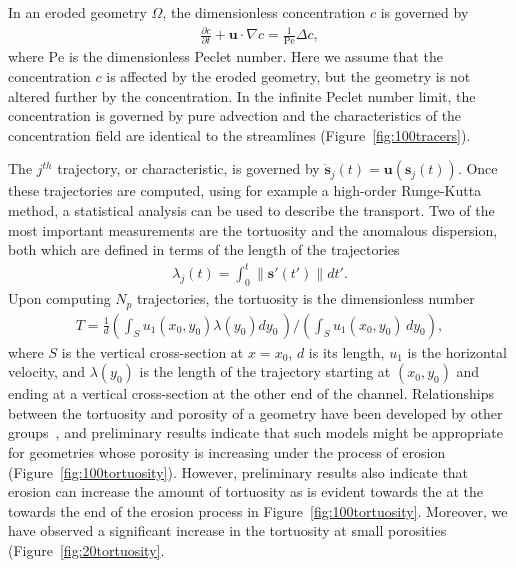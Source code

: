 \documentclass[11pt]{article}
\newcommand{\pd}[2]{ \frac{ \partial #1}{ \partial #2 } }
\newcommand{\bvec}[1]{{\mathbf{#1}}}
\newcommand{\Pe}{\mathrm{Pe}}
\newcommand{\uu}{\bvec{u}}
\renewcommand{\ss}{{\mathbf{s}}}
\begin{document}
In an eroded geometry $\Omega$, the dimensionless
concentration $c$ is governed by
\begin{align}
  \pd{c}{t} + \uu \cdot \nabla c = \frac{1}{\Pe} \Delta c, 
  \label{eqn:advectionDiffusion}
\end{align}
where $\Pe$ is the dimensionless Peclet number. Here we assume that the
concentration $c$ is affected by the eroded geometry, but the geometry
is not altered further by the concentration. In the infinite Peclet
number limit, the concentration is governed by pure advection and the
characteristics of the concentration field are identical to the
streamlines (Figure~\ref{fig:100tracers}).

The $j^{th}$ trajectory, or characteristic, is governed by $\dot{\ss}_j(t) = \uu(\ss_j(t))$. Once these trajectories are computed, using for example a high-order Runge-Kutta method, a statistical analysis can be used to describe the transport. Two of the most important measurements are the tortuosity and the anomalous dispersion, both which are defined in terms of the length of the trajectories \begin{align}
  \lambda_j(t) = \int_{0}^{t} \|\ss'(t')\| dt'.
\end{align}
Upon computing $N_p$ trajectories, the tortuosity is the dimensionless number
\begin{align}
  T = \frac{1}{d} \left(\int_{S} u_1(x_0,y_0)\lambda(y_0) dy_0\, \right)
  \Bigg/ \left(\int_S u_1(x_0,y_0)\, dy_0 \right),
\end{align}
where $S$ is the vertical cross-section at $x=x_0$, $d$ is its length,
$u_1$ is the horizontal velocity, and $\lambda(y_0)$ is the length of
the trajectory starting at $(x_0,y_0)$ and ending at a vertical
cross-section at the other end of the channel. Relationships between the
tortuosity and porosity of a geometry have been developed by other
groups~\cite{kop-kat-tim1996, dud-koz-mat2011, mat-kha-koz2008}, and
preliminary results indicate that such models might be appropriate for
geometries whose porosity is increasing under the process of erosion
(Figure~\ref{fig:100tortuosity}). However, preliminary results also
indicate that erosion can increase the amount of tortuosity as is
evident towards the at the towards the end of the erosion process in
Figure~\ref{fig:100tortuosity}. Moreover, we have observed a significant
increase in the tortuosity at small porosities
(Figure~\ref{fig:20tortuosity}.
\end{document}

